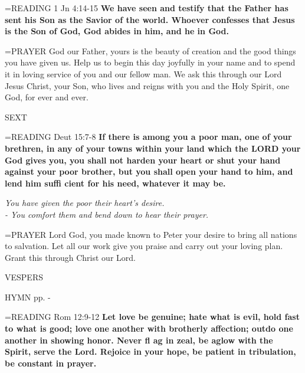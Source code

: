 \hangindent=\parindent \small{READING} 1 Jn 4:14-15 \textbf{We have seen and testify that the Father has sent his Son as the Savior of the world. Whoever confesses that Jesus is the Son of God, God abides in him, and he in God.  \\}

\hangindent=\parindent \small{PRAYER  God our Father, yours is the beauty of creation and the good things you have given us. Help us to begin this day joyfully in your name and to spend it in loving service of you and our fellow man.  We ask this through our Lord Jesus Christ, your Son, who lives and reigns with you and the Holy Spirit, one God, for ever and ever.}

\begin{flushleft}\normalsize SEXT\\\end{flushleft}

\hangindent=\parindent \small{READING} Deut 15:7-8 \textbf{If there is among you a poor man, one of your brethren, in any of your towns within your land which the LORD your God gives you, you shall not harden your heart or shut your hand against your poor brother, but you shall open your hand to him, and lend him suffi cient for his need, whatever it may be.}

\begin{center}
\textit{You have given the poor their heart’s desire.\\
- You comfort them and bend down to hear their prayer.}
\end{center}

\hangindent=\parindent \small{PRAYER  Lord God, you made known to Peter your desire to bring all nations to salvation. Let all our work give you praise and carry out your loving plan. Grant this through Christ our Lord.}

\begin{flushleft}\normalsize VESPERS\\\end{flushleft}

HYMN pp. \pageref{ordinaryTime:fourthHymn} - \pageref{ordinaryTime:sixthHymn}

\hangindent=\parindent \small{READING} Rom 12:9-12 \textbf{Let love be genuine; hate what is evil, hold fast to what is good; love one another with brotherly affection; outdo one another in showing honor. Never fl ag in zeal, be aglow with the Spirit, serve the Lord. Rejoice in your hope, be patient in tribulation, be constant in prayer.\\}

